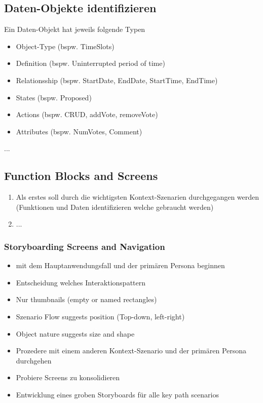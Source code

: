 \documentclass{report}
\theoremstyle{definition}
\theoremstyle{example}
\begin{document}
\subsection{Daten-Objekte identifizieren}
Ein Daten-Objekt hat jeweils folgende Typen
\begin{itemize}
   \item Object-Type (bspw. TimeSlots)
   \item Definition (bspw. Uninterrupted period of time)
   \item Relationsship (bspw. StartDate, EndDate, StartTime, EndTime)
   \item States (bspw. Proposed)
   \item Actions (bspw. CRUD, addVote, removeVote)
   \item Attributes (bspw. NumVotes, Comment)
\end{itemize}

...

\subsection{Function Blocks and Screens}
\begin{enumerate}
   \item Als erstes soll durch die wichtigsten Kontext-Szenarien durchgegangen werden (Funktionen und Daten identifizieren welche gebraucht werden)
   \item ...
\end{enumerate}

\subsubsection{Storyboarding Screens and Navigation}
\begin{itemize}
   \item mit dem Hauptanwendungsfall und der primären Persona beginnen
   \item Entscheidung welches Interaktionspattern
   \item Nur thumbnails (empty or named rectangles)
   \item Szenario Flow suggests position (Top-down, left-right)
   \item Object nature suggests size and shape
   \item Prozedere mit einem anderen Kontext-Szenario und der primären Persona durchgehen
   \item Probiere Screens zu konsolidieren
   \item Entwicklung eines groben Storyboards für alle key path scenarios
\end{itemize}
\end{document}
